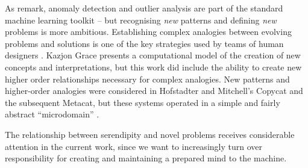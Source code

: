 As  remark, anomaly detection and
outlier analysis are part of the standard machine learning toolkit --
but recognising \emph{new} patterns and defining \emph{new} problems
is more ambitious.  Establishing complex analogies between evolving problems and
solutions is one of the key strategies used by teams of human designers
\cite{Analogical-problem-evolution-DCC}.  Kazjon Grace
\citeyear{kaz-thesis} presents a computational model of the creation
of new concepts and interpretations, but this work did include the
ability to create new higher order relationships necessary for complex
analogies.  New patterns and higher-order analogies were considered in
Hofstadter and Mitchell's {\sf Copycat} and the subsequent {\sf
  Metacat}, but these systems operated in a simple and fairly abstract
``microdomain''
\cite{hofstadter1994copycat,DBLP:journals/jetai/Marshall06}.  %

The relationship between serendipity and novel problems receives
considerable attention in the current work, since we want to
increasingly turn over responsibility for creating and maintaining a
prepared mind to the machine.
